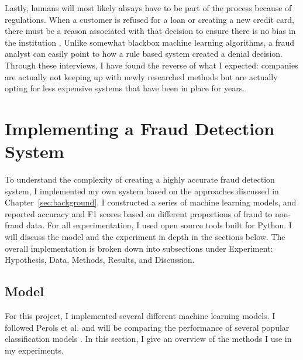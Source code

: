\documentclass[midd]{thesis}
\begin{document}
Lastly, humans will most likely always have to be part of the process because of regulations. When a customer is refused for a loan or creating a new credit card, there must be a reason associated with that decision to ensure there is no bias in the institution \cite{FDIC}. Unlike somewhat blackbox machine learning algorithms, a fraud analyst can easily point to how a rule based system created a denial decision. Through these interviews, I have found the reverse of what I expected: companies are actually not keeping up with newly researched methods but are actually opting for less expensive systems that have been in place for years. 



\pagebreak
\chapter{Implementing a Fraud Detection System}
\label{sec:impl}


To understand the complexity of creating a highly accurate fraud detection system, I implemented my own system based on the approaches discussed in Chapter~\ref{sec:background}. I constructed a series of machine learning models, and reported accuracy and F1 scores based on different proportions of fraud to non-fraud data. For all experimentation, I used open source tools built for Python. I will discuss the model and the experiment in depth in the sections below. The overall implementation is broken down into subsections under Experiment: Hypothesis, Data, Methods, Results, and Discussion. 

\section{Model} 

For this project, I implemented several different machine learning models. I followed Perols et al. and will be comparing the performance of several popular classification models \cite{Perols2011}. In this section, I give an overview of the methods I use in my experiments.

\end{document}
